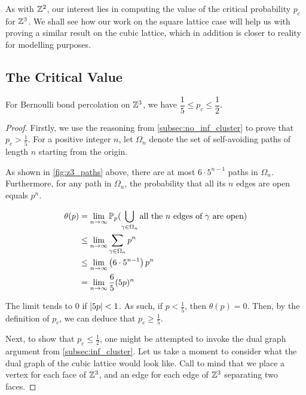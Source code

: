 \documentclass[a4paper, 12pt]{article}
\begin{document}
As with $\Z^2$, our interest lies in computing the value of the critical probability $p_c$ for $\Z^3$. We shall see how our work on the square lattice case will help us with proving a similar result on the cubic lattice, which in addition is closer to reality for modelling purposes.

\subsection{The Critical Value}
\begin{thm}\label{thm:pc_on_Z3}
For Bernoulli bond percolation on $\Z^3$, we have $\dfrac{1}{5} \leq p_c \leq \dfrac{1}{2}$.
\end{thm}
\begin{proof}
Firstly, we use the reasoning from \cref{subsec:no_inf_cluster} to prove that $p_c > \frac{1}{5}$. For a positive integer $n$, let $\Omega_n$ denote the set of self-avoiding paths of length $n$ starting from the origin.



As shown in \cref{fig:z3_paths} above, there are at most $6 \cdot 5^{n - 1}$ paths in $\Omega_n$. Furthermore, for any path in $\Omega_n$, the probability that all its $n$ edges are open equals $p^n$.

\begin{align*}
    \theta(p) 
    &= \lim_{n \to \infty} \P(\bigcup_{\gamma \in \Omega_n} \text{all the } n \text{ edges of } \gamma \text{ are open})\\
    &\leq \lim_{n \to \infty} \sum_{\gamma \in \Omega_n} p^n\\
    &\leq \lim_{n \to \infty} \left(6 \cdot 5^{n - 1}\right) p^n\\
    &= \lim_{n \to \infty} \frac{6}{5} (5 p)^{n}
\end{align*}

The limit tends to 0 if $\abs{5p} < 1$. As such, if $p < \frac{1}{5}$, then $\theta(p) = 0$. Then, by the definition of $p_c$, we can deduce that $p_c \geq \frac{1}{5}$.

Next, to show that $p_c \leq \frac{1}{2}$, one might be attempted to invoke the dual graph argument from \cref{subsec:inf_cluster}. Let us take a moment to consider what the dual graph of the cubic lattice would look like. Call to mind that we place a vertex for each face of $\Z^3$, and an edge for each edge of $\Z^3$ separating two faces.




\end{proof}
\end{document}
